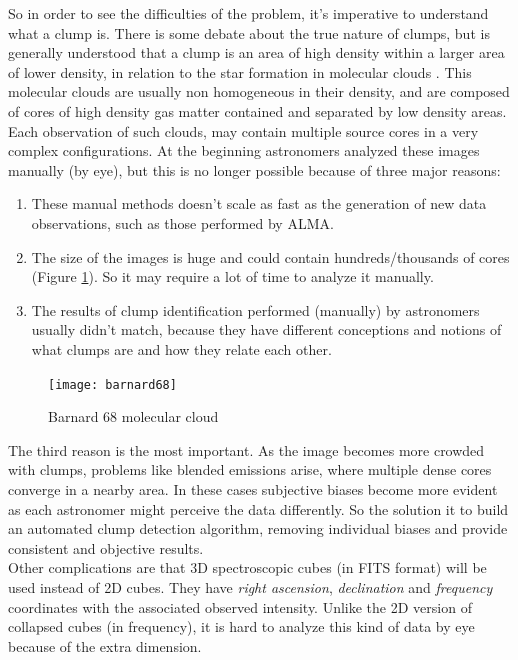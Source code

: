 \documentclass[letter, 11pt]{article}
\begin{document}
So in order to see the difficulties of the problem, it's imperative to understand what a clump is. There is some debate about the true nature of clumps, but is generally understood that a clump is an area of high density within a larger area of lower density, in relation to the star formation in molecular clouds \cite{Kennicutt}. This molecular clouds are usually non homogeneous in their density, and are composed of cores of high density gas matter contained and separated by low density areas. Each observation of such clouds, may contain multiple source cores in a very complex configurations. At the beginning astronomers analyzed these images manually (by eye), but this is no longer possible because of three major reasons:
\begin{enumerate}
    \item These manual methods doesn't scale as fast as the generation of new data observations, such as those performed by ALMA.
    \item The size of the images is huge and could contain hundreds/thousands of cores (Figure \ref{fig:barnard68}). So it may require a lot of time to analyze it manually.
    \item The results of clump identification performed (manually) by astronomers usually didn't match, because they have different conceptions and notions of what clumps are and how they relate each other.
\end{enumerate}

\begin{figure}[htpb!]
\centering
\texttt{[image: barnard68]}
\caption{Barnard 68 molecular cloud}
\label{fig:barnard68}
\end{figure}

The third reason is the most important. As the image becomes more crowded with clumps, problems like blended emissions arise, where multiple dense cores converge in a nearby area. In these cases subjective biases become more evident as each astronomer might perceive the data differently. So the solution it to build an automated clump detection algorithm, removing individual biases and provide consistent and objective results.\\

Other complications are that 3D spectroscopic cubes (in FITS format) will be used instead of 2D cubes. They have \textit{right ascension}, \textit{declination} and \textit{frequency} coordinates with the associated observed intensity. Unlike the 2D version of collapsed cubes (in frequency), it is hard to analyze this kind of data by eye because of the extra dimension.\\
\end{document}
